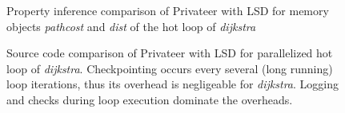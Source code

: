 \begin{figure}[!t]
\centering
{}
\caption{Property inference comparison of Privateer with LSD for memory
objects \textit{pathcost} and \textit{dist} of the hot loop of \textit{dijkstra}}
\label{fig:dijkstra_motivation_comparison}
\end{figure}

\begin{figure}[!b]
\centering
\scriptsize
{}
\caption{Source code comparison of Privateer with LSD for parallelized hot loop
of \textit{dijkstra}. Checkpointing occurs every several (long running) loop iterations, thus its
overhead is negligeable for \textit{dijkstra}. Logging and checks
during loop execution dominate the overheads.}
\label{fig:dijkstra_motivation_comparison_source_code}
\end{figure}



